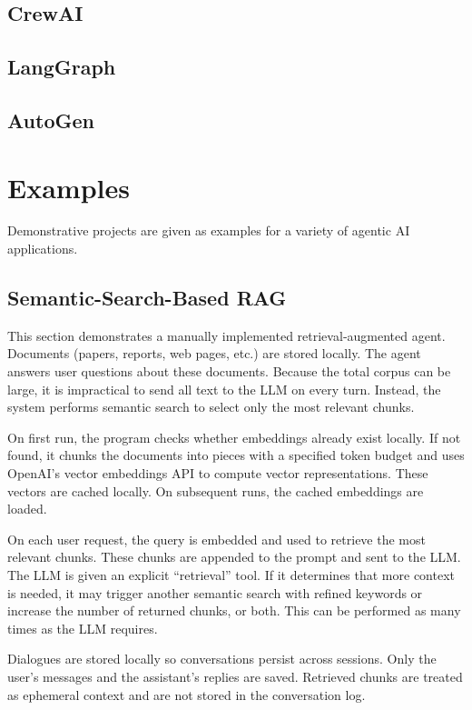 \subsection{CrewAI}

\subsection{LangGraph}

\subsection{AutoGen}

\section{Examples}

Demonstrative projects are given as examples for a variety of agentic AI applications. 

\subsection{Semantic-Search-Based RAG}

This section demonstrates a manually implemented retrieval‑augmented agent. Documents (papers, reports, web pages, etc.) are stored locally. The agent answers user questions about these documents. Because the total corpus can be large, it is impractical to send all text to the LLM on every turn. Instead, the system performs semantic search to select only the most relevant chunks.

On first run, the program checks whether embeddings already exist locally. If not found, it chunks the documents into pieces with a specified token budget and uses OpenAI’s vector embeddings API to compute vector representations. These vectors are cached locally. On subsequent runs, the cached embeddings are loaded.

On each user request, the query is embedded and used to retrieve the most relevant chunks. These chunks are appended to the prompt and sent to the LLM. The LLM is given an explicit ``retrieval'' tool. If it determines that more context is needed, it may trigger another semantic search with refined keywords or increase the number of returned chunks, or both. This can be performed as many times as the LLM requires.

Dialogues are stored locally so conversations persist across sessions. Only the user’s messages and the assistant’s replies are saved. Retrieved chunks are treated as ephemeral context and are not stored in the conversation log.

